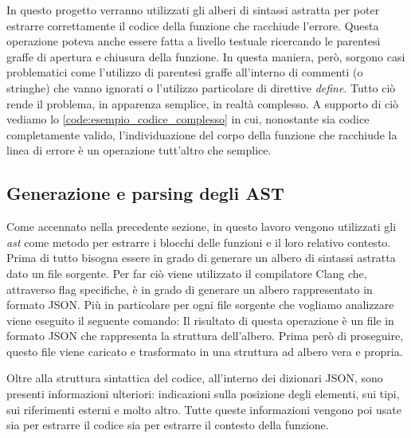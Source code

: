 In questo progetto verranno utilizzati gli alberi di sintassi astratta per poter estrarre correttamente il codice della funzione che racchiude l'errore. 
Questa operazione poteva anche essere fatta a livello testuale ricercando le parentesi graffe di apertura e chiusura della funzione. 
In questa maniera, però, sorgono casi problematici come l'utilizzo di parentesi graffe all'interno di commenti (o stringhe) che vanno ignorati o l'utilizzo particolare di direttive \textit{define}.
Tutto ciò rende il problema, in apparenza semplice, in realtà complesso.
A supporto di ciò vediamo lo \autoref{code:esempio_codice_complesso} in cui, nonostante sia codice \CPP{} completamente valido, l'individuazione del corpo della funzione che racchiude la linea di errore è un operazione tutt'altro che semplice.

\begin{code}[language=c++, caption={Esempio di codice valido con struttura particolare}, label={code:esempio_codice_complesso}]
  #DEFINE OPENBRACKET {
  #DEFINE CLOSEBRACKET }
  void foo()OPENBRACKET
    int error = 5 / 0; // Linea contente l'errore

    /* Questo commento rende difficile l'individuazione del corpo della funzione }
    */

  CLOSEBRACKET
\end{code}

\subsection{Generazione e parsing degli AST}
Come accennato nella precedente sezione, in questo lavoro vengono utilizzati gli \textit{ast} come metodo per estrarre i blocchi delle funzioni e il loro relativo contesto.
Prima di tutto bisogna essere in grado di generare un albero di sintassi astratta dato un file sorgente.
Per far ciò viene utilizzato il compilatore Clang che, attraverso flag specifiche, è in grado di generare un albero rappresentato in formato JSON.
Più in particolare per ogni file sorgente che vogliamo analizzare viene eseguito il seguente comando:
Il risultato di questa operazione è un file in formato JSON che rappresenta la struttura dell'albero.
Prima però di proseguire, questo file viene caricato e trasformato in una struttura ad albero vera e propria.

Oltre alla struttura sintattica del codice, all'interno dei dizionari JSON, sono presenti informazioni ulteriori: indicazioni sulla posizione degli elementi, sui tipi, sui riferimenti esterni e molto altro.
Tutte queste informazioni vengono poi usate sia per estrarre il codice sia per estrarre il contesto della funzione. 

